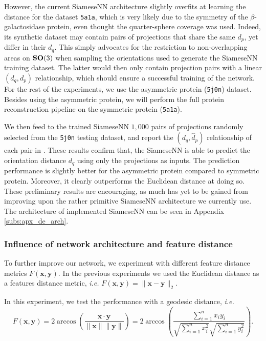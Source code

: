 However, the current SiameseNN architecture slightly overfits at learning the distance for the dataset \texttt{5a1a}, which is very likely due to the symmetry of the $\beta$-galactosidase protein, even thought the quarter-sphere coverage was used.
Indeed, its synthetic dataset may contain pairs of projections that share the same $d_p$, yet differ in their $d_q$.
This simply advocates for the restriction to non-overlapping areas on $\mathrm{\mathbf{SO}}(3)$ when sampling the orientations used to generate the SiameseNN training dataset.
The latter would then only contain projection pairs with a linear $(d_q,d_p)$ relationship, which should ensure a successful training of the network.
For the rest of the experiments, we use the asymmetric protein (\texttt{5j0n}) dataset. Besides using the asymmetric protein, we will perform the full protein reconstruction pipeline on the symmetric protein (\texttt{5a1a}).

We then feed to the trained SiameseNN $1,000$ pairs of projections randomly selected from the \texttt{5j0n} testing dataset, and report the $(d_q,\widehat{d}_p)$ relationship of each pair in .
These results confirm that, the SiameseNN is able to predict the orientation distance $d_q$ using only the projections as inputs. The prediction performance is slightly better for the asymmetric protein compared to symmetric protein.
Moreover, it clearly outperforms the Euclidean distance at doing so.
These preliminary results are encouraging, as much has yet to be gained from improving upon the rather primitive SiameseNN architecture we currently use. The architecture of implemented SiameseNN can be seen in Appendix \ref{subs:apx_de_arch}.

\subsubsection{Influence of network architecture and feature distance}


To further improve our network, we experiment with different feature distance metrics $F(\mathbf{x},\mathbf{y})$. 
In the previous experiments we used the Euclidean distance as a features distance metric, \textit{i.e.} $F(\mathbf{x},\mathbf{y})=\lVert \mathbf{x}-\mathbf{y}\rVert_2$. 

In this experiment, we test the performance with a geodesic distance, \textit{i.e.}
\begin{equation}
    F(\mathbf{x},\mathbf{y})=2 \arccos(\frac{\mathbf{x} \cdot \mathbf{y}}{\lVert \mathbf{x} \rVert \lVert \mathbf{y} \rVert}) = 2 \arccos(\frac{\sum_{i=1}^n x_i y_i}{\sqrt{\sum_{i=1}^n x_i^2}\sqrt{\sum_{i=1}^n y_i^2 }}).
    \label{eqn:geodesic-distance}
\end{equation}

